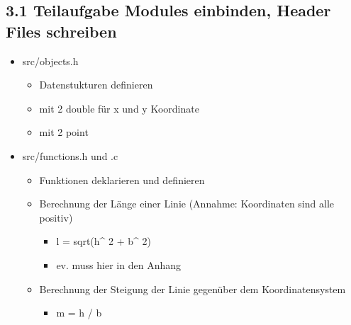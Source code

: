 \documentclass[a4paper,10pt,english]{report}
\begin{document}
\subsection{3.1 Teilaufgabe Modules einbinden, Header Files schreiben}
\label{\detokenize{P04_Modularisieren_von_C_Code/new_P04/P04_Modularisieren_von_C_Code:teilaufgabe-modules-einbinden-header-files-schreiben}}\begin{itemize}
\item {} 
\sphinxAtStartPar
src/objects.h
\begin{itemize}
\item {} 
 Datenstukturen definieren

\item {} 
\sphinxAtStartPar
{} mit 2 double für x und y Koordinate

\item {} 
\sphinxAtStartPar
{} mit 2 point

\end{itemize}

\item {} 
\sphinxAtStartPar
src/functions.h und .c
\begin{itemize}
\item {} 
 Funktionen deklarieren und definieren

\item {} 
\sphinxAtStartPar
Berechnung der Länge einer Linie (Annahme: Koordinaten sind alle positiv)
\begin{itemize}
\item {} 
\sphinxAtStartPar
l = sqrt(h\textasciicircum{} 2 + b\textasciicircum{} 2)

\item {} 
\sphinxAtStartPar
ev. muss hier in den Anhang 

\end{itemize}

\item {} 
\sphinxAtStartPar
Berechnung der Steigung  der Linie gegenüber dem Koordinatensystem
\begin{itemize}
\item {} 
\sphinxAtStartPar
m = h / b

\end{itemize}

\end{itemize}


\end{itemize}
\end{document}
